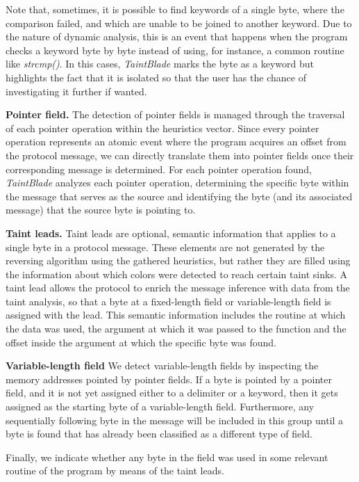 \documentclass[conference]{IEEEtran}
\begin{document}
Note that, sometimes, it is possible to find keywords of a single byte, where
the comparison failed, and which are unable to be joined to another
keyword. Due to the nature of dynamic analysis, this is an event that happens
when the program checks a keyword byte by byte instead of using, for instance,
a common routine like \textit{strcmp()}. In this cases, \textit{TaintBlade}
marks the byte as a keyword but highlights the fact that it is isolated so that
the user has the chance of investigating it further if wanted.

\textbf{Pointer field.} The detection of pointer fields is managed through the
traversal of each pointer operation within the heuristics vector. Since
every pointer operation represents an atomic event where the program
acquires an offset from the protocol message, we can directly
translate them into pointer fields once their corresponding message is determined. 
For each pointer operation found, \textit{TaintBlade} analyzes each pointer operation, 
determining the specific byte within the message that serves as the source and identifying 
the byte (and its associated message) that the source byte is pointing to.

\textbf{Taint leads.} Taint leads are optional, semantic information that applies to a single byte in a protocol message.
These elements are not generated by the reversing algorithm using the gathered heuristics, but rather
they are filled using the information about which colors were detected to reach certain taint sinks.
A taint lead allows the protocol to enrich the message inference with data from the taint analysis,
so that a byte at a fixed-length field or variable-length field is assigned with the lead.
This semantic information includes the routine at which the data was used, the argument at which it was
passed to the function and the offset inside the argument at which the specific byte was found.

\textbf{Variable-length field} We detect variable-length fields by inspecting the memory addresses
pointed by pointer fields. If a byte is pointed by a pointer field, and it is not yet assigned either
to a delimiter or a keyword, then it gets assigned as the starting byte of a variable-length field.
Furthermore, any sequentially following
byte in the message will be included in this group until a
byte is found that has already been classified as a different
type of field. 

Finally, we indicate whether any byte in
the field was used in some relevant routine of the program by
means of the taint leads.
\end{document}
